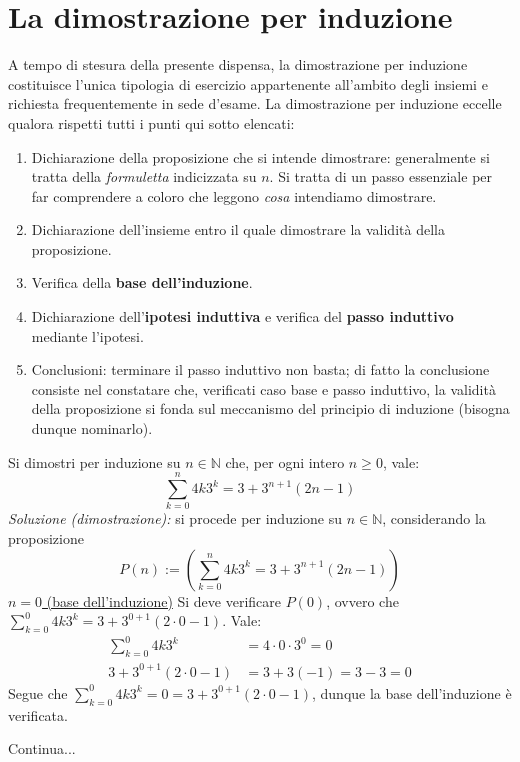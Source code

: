\documentclass[oneside]{book}
\theoremstyle{remark}
\begin{document}
\section{La dimostrazione per induzione}
A tempo di stesura della presente dispensa, la dimostrazione per induzione
costituisce l'unica tipologia di esercizio appartenente all'ambito degli
insiemi e richiesta frequentemente in sede d'esame.
La dimostrazione per induzione eccelle qualora rispetti tutti i punti qui
sotto elencati:
\begin{enumerate}
\item Dichiarazione della proposizione che si intende dimostrare:
generalmente si tratta della \textit{formuletta} indicizzata su $n$.
Si tratta di un passo essenziale per far comprendere a coloro che
leggono \textit{cosa} intendiamo dimostrare.
\item Dichiarazione dell'insieme entro il quale dimostrare la
validità della proposizione.
\item Verifica della \textbf{base dell'induzione}.
\item Dichiarazione dell'\textbf{ipotesi induttiva} e verifica del
\textbf{passo induttivo} mediante l'ipotesi.
\item Conclusioni: terminare il passo induttivo non basta; di fatto
la conclusione consiste nel constatare che, verificati caso base e
passo induttivo, la validità della proposizione si fonda sul meccanismo
del principio di induzione (bisogna dunque nominarlo).
\end{enumerate}

\begin{tcolorbox}[colback=blue!30, colframe=blue!30!black, title=Esempio]
Si dimostri per induzione su $n\in\mathbb{N}$ che, per ogni intero $n\geq0$,
vale: \[ \sum_{k=0}^{n}4k3^k=3+3^{n+1}(2n-1) \]
\textit{Soluzione (dimostrazione):} si procede per induzione su $n\in\mathbb{N}$,
considerando la proposizione \[P(n):=\left( \sum_{k=0}^{n}4k3^k=3+3^{n+1}(2n-1) \right)\]
\underline{$n=0$ (base dell'induzione)} Si deve verificare $P(0)$,
ovvero che $\sum_{k=0}^{0}4k3^k=3+3^{0+1}(2\cdot0-1)$.
Vale:
\begin{align*}
\sum_{k=0}^{0}4k3^k  &=4\cdot0\cdot3^0=0\\
3+3^{0+1}(2\cdot0-1) &=3+3(-1)=3-3=0
\end{align*}
Segue che $\sum_{k=0}^{0}4k3^k=0=3+3^{0+1}(2\cdot0-1)$, dunque la base
dell'induzione è verificata.
\begin{flushright}
    Continua...
\end{flushright}
\end{tcolorbox}
\end{document}
